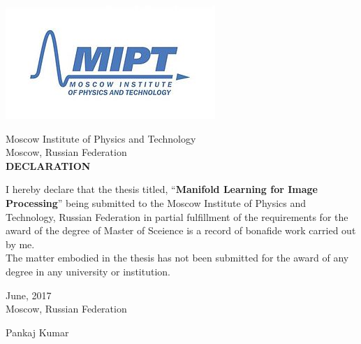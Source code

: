 \documentclass[12pt, oneside]{Thesis} %
\begin{document}
\pagestyle{fancy} %
\begin{center}
\begin{center}
\includegraphics[scale=0.8]{./snulogo.png}
\end{center}
\singlespacing
\singlespacing
\begin{center}
\textmd{Moscow Institute of Physics and Technology}\\
\singlespacing
Moscow, Russian Federation\\
\singlespacing
\singlespacing
\singlespacing
\singlespacing
\singlespacing
\textbf{DECLARATION\\}
\end{center}
\end{center}
I hereby declare that the thesis titled, ``\textbf{Manifold Learning for Image Processing}” being submitted to the Moscow Institute of Physics and Technology, Russian Federation in partial fulfillment of the requirements for the award of the degree of Master of Sceience is a record of bonafide work carried out by me.\\

The matter embodied in the thesis has not been submitted for the award of any degree in any university or institution.\\
\singlespacing
\singlespacing
\singlespacing
\singlespacing
\singlespacing
\singlespacing
\begin{minipage}{.45\linewidth}
\begin{flushleft}                       
June, 2017 \\
Moscow, Russian Federation \\
\end{flushleft} 
\end{minipage}
\hfill
\begin{minipage}{.45\linewidth}
\begin{flushright}                                      

Pankaj Kumar\\

\end{flushright} 
\end{minipage}
\clearpage %
\end{document}
